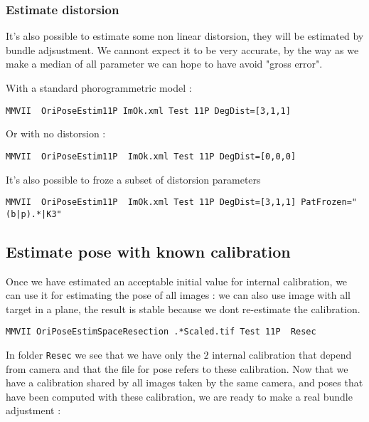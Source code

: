 
\subsubsection{Estimate distorsion}

It's also possible to estimate some non linear distorsion, they will be
estimated by bundle adjsustment. We cannont expect it to be  very accurate,
by the way as we make a median of all parameter we can hope to have 
avoid "gross  error".

With a standard phorogrammetric model :

\begin{lstlisting}
MMVII  OriPoseEstim11P ImOk.xml Test 11P DegDist=[3,1,1]
\end{lstlisting}

Or with no distorsion :

\begin{lstlisting}
MMVII  OriPoseEstim11P  ImOk.xml Test 11P DegDist=[0,0,0]
\end{lstlisting}

It's also possible to froze a subset of distorsion parameters 

\begin{lstlisting}
MMVII  OriPoseEstim11P  ImOk.xml Test 11P DegDist=[3,1,1] PatFrozen="(b|p).*|K3"
\end{lstlisting}


\subsection{Estimate pose with known calibration}

Once we have estimated an acceptable initial value for internal 
calibration, we can use it for estimating the pose of all images :
we can also use image with all target in a plane, the result is stable
because we dont re-estimate the calibration.

\begin{lstlisting}
MMVII OriPoseEstimSpaceResection .*Scaled.tif Test 11P  Resec
\end{lstlisting}

In folder {\tt Resec} we see that we have only the $2$ internal calibration
that depend from camera and that the file for pose refers to these calibration.
Now that we have a calibration shared by all images taken by the same camera, and 
poses that have been computed with these calibration, we are ready to make
a real bundle adjustment :


